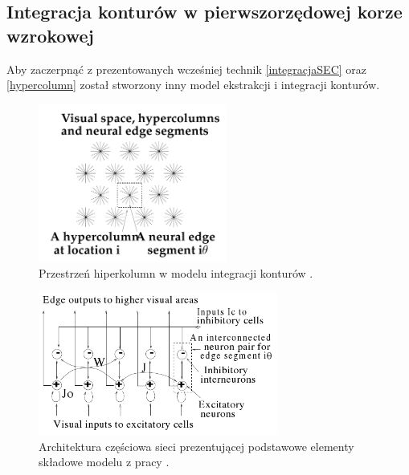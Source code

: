 \subsection{Integracja konturów w pierwszorzędowej korze wzrokowej}
\label{integracjaLi}


Aby zaczerpnąć z prezentowanych wcześniej technik \ref{integracjaSEC} oraz \ref{hypercolumn} został stworzony inny model ekstrakcji i integracji konturów.\\ 
\begin{figure}[ht]
	\centering
	\includegraphics[width=0.55\textwidth]{images/li_hypercolumn.png}
	\caption{Przestrzeń hiperkolumn w modelu integracji konturów \cite{Li1998}.}
	\label{fig:li_hypercolumn}
\end{figure}

\begin{figure}[ht]
	\centering
	\includegraphics[width=0.7\textwidth]{images/li_arch.png}
	\caption{Architektura częściowa sieci prezentującej podstawowe elementy składowe modelu z pracy \cite{Li1998}.}
	\label{fig:li_arch}
\end{figure}

